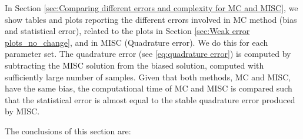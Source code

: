 In Section \ref{sec:Comparing different  errors and complexity for MC and MISC}, we show tables and plots reporting  the different errors involved in MC method (bias and statistical error), related to the plots in Section \ref{sec:Weak error plots_no_change}, and in MISC (Quadrature error). We do this for each parameter set. The quadrature error (see \eqref{eq:quadrature error}) is computed by subtracting the MISC solution from the biased solution, computed with sufficiently large  number of samples. Given that both methods, MC and MISC, have the same bias,  the computational time of MC and MISC is compared such that the statistical error is almost equal to the stable quadrature error produced by MISC.

 The conclusions of this section are: 


	\begin{enumerate}
		

\end{enumerate}
